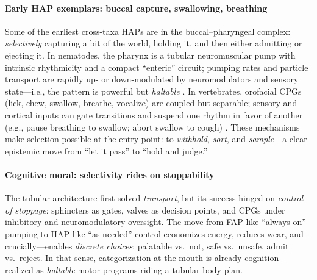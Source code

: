 \paragraph{Early HAP exemplars: buccal capture, swallowing, breathing}
Some of the earliest cross-taxa HAPs are in the buccal–pharyngeal complex: \emph{selectively} capturing a bit of the world, holding it, and then either admitting or ejecting it. In nematodes, the pharynx is a tubular neuromuscular pump with intrinsic rhythmicity and a compact “enteric” circuit; pumping rates and particle transport are rapidly up- or down-modulated by neuromodulators and sensory state—i.e., the pattern is powerful but \emph{haltable} \citep{Avery2012CelegansFeeding,Trojanowski2016PharyngealPumping}. In vertebrates, orofacial CPGs (lick, chew, swallow, breathe, vocalize) are coupled but separable; sensory and cortical inputs can gate transitions and suspend one rhythm in favor of another (e.g., pause breathing to swallow; abort swallow to cough) \citep{Moore2014BrainstemOrofacial,Matsuo2009Coordination,Huff2023PiCo}. These mechanisms make selection possible at the entry point: to \emph{withhold}, \emph{sort}, and \emph{sample}—a clear epistemic move from “let it pass” to “hold and judge.” 

\paragraph{Cognitive moral: selectivity rides on stoppability}
The tubular architecture first solved \emph{transport}, but its success hinged on \emph{control of stoppage}: sphincters as gates, valves as decision points, and CPGs under inhibitory and neuromodulatory oversight. The move from FAP-like “always on” pumping to HAP-like “as needed” control economizes energy, reduces wear, and—crucially—enables \emph{discrete choices}: palatable vs.\ not, safe vs.\ unsafe, admit vs.\ reject. In that sense, categorization at the mouth is already cognition—realized as \emph{haltable} motor programs riding a tubular body plan.
